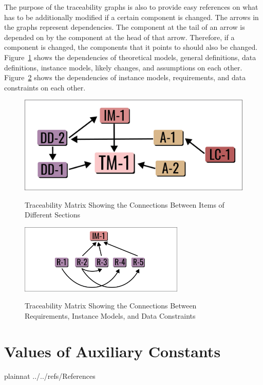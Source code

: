 \documentclass[12pt]{article}
\begin{document}
The purpose of the traceability graphs is also to provide easy references on
what has to be additionally modified if a certain component is changed.  The
arrows in the graphs represent dependencies. The component at the tail of an
arrow is depended on by the component at the head of that arrow. Therefore, if a
component is changed, the components that it points to should also be
changed. Figure~\ref{Fig_ATrace} shows the dependencies of theoretical models,
general definitions, data definitions, instance models, likely changes, and
assumptions on each other. Figure~\ref{Fig_RTrace} shows the dependencies of
instance models, requirements, and data constraints on each other.

\begin{figure}[h!]
	\begin{center}
		{
			\includegraphics[width=\textwidth]{sublimat_atrace.png}
		}
		\caption{\label{Fig_ATrace} Traceability Matrix Showing the Connections Between Items of Different Sections}
	\end{center}
\end{figure}


\begin{figure}[h!]
	\begin{center}
		{
			\includegraphics[width=0.7\textwidth]{sublimat_rtrace.png}
		}
		\caption{\label{Fig_RTrace} Traceability Matrix Showing the Connections Between Requirements, Instance Models, and Data Constraints}
	\end{center}
\end{figure}


\section{Values of Auxiliary Constants}

\newpage

 {plainnat}
 {../../refs/References}
\end{document}
